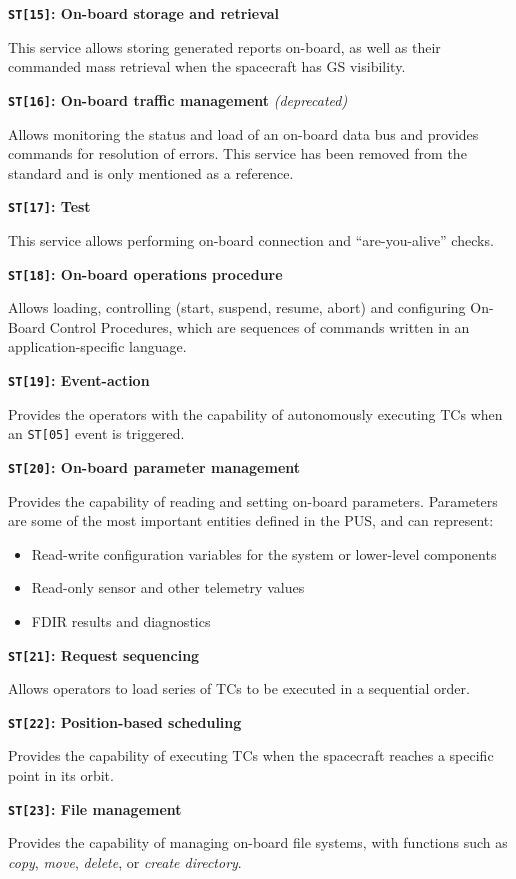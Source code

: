 \documentclass[a4paper,nobib]{tufte-book}
\begin{document}
\begin{compactitem}
	\item \textbf{\texttt{ST[15]}: On-board storage and retrieval}
	
	This service allows storing generated reports on-board, as well as their commanded mass retrieval when the spacecraft has \acl{GS} visibility.
	
	\item \textbf{\texttt{ST[16]}: On-board traffic management} \emph{(deprecated)}
	
	Allows monitoring the status and load of an on-board data bus and provides commands for resolution of errors. This service has been removed from the standard and is only mentioned as a reference.
	
	\item \textbf{\texttt{ST[17]}: Test}
	
	This service allows performing on-board connection and ``are-you-alive'' checks.
	
	\item \textbf{\texttt{ST[18]}: On-board operations procedure}
	
	Allows loading, controlling (start, suspend, resume, abort) and configuring On-Board Control Procedures, which are sequences of commands written in an application-specific language.
	
	\item \textbf{\texttt{ST[19]}: Event-action}
	
	Provides the operators with the capability of autonomously executing \acp{TC} when an \texttt{ST[05]} event is triggered.
	
	\item \textbf{\texttt{ST[20]}: On-board parameter management}
	
	Provides the capability of reading and setting on-board parameters. Parameters are some of the most important entities defined in the \acs{PUS}, and can represent:
	\begin{itemize}
		\item Read-write configuration variables for the system or lower-level components
		\item Read-only sensor and other telemetry values
		\item \ac{FDIR} results and diagnostics
	\end{itemize}
	
	\item \textbf{\texttt{ST[21]}: Request sequencing}
	
	Allows operators to load series of \acp{TC} to be executed in a sequential order.
	
	\item \textbf{\texttt{ST[22]}: Position-based scheduling}
	
	Provides the capability of executing \acp{TC} when the spacecraft reaches a specific point in its orbit.
	
	\item \textbf{\texttt{ST[23]}: File management}
	
	Provides the capability of managing on-board file systems, with functions such as \emph{copy}, \emph{move}, \emph{delete}, or \emph{create directory}.
\end{compactitem}
\end{document}
